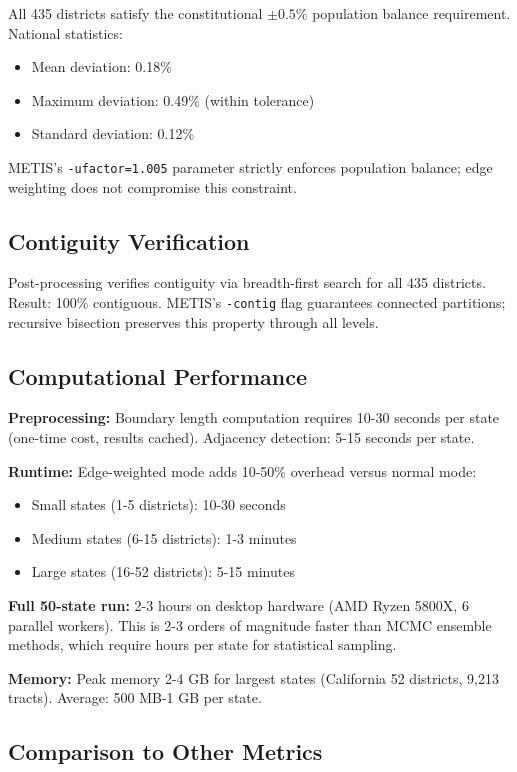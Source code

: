 All 435 districts satisfy the constitutional $\pm 0.5\%$ population balance requirement. National statistics:
\begin{itemize}
    \item Mean deviation: 0.18\%
    \item Maximum deviation: 0.49\% (within tolerance)
    \item Standard deviation: 0.12\%
\end{itemize}

METIS's \texttt{-ufactor=1.005} parameter strictly enforces population balance; edge weighting does not compromise this constraint.

\subsection{Contiguity Verification}

Post-processing verifies contiguity via breadth-first search for all 435 districts. Result: 100\% contiguous. METIS's \texttt{-contig} flag guarantees connected partitions; recursive bisection preserves this property through all levels.

\subsection{Computational Performance}

\textbf{Preprocessing:} Boundary length computation requires 10-30 seconds per state (one-time cost, results cached). Adjacency detection: 5-15 seconds per state.

\textbf{Runtime:} Edge-weighted mode adds 10-50\% overhead versus normal mode:
\begin{itemize}
    \item Small states (1-5 districts): 10-30 seconds
    \item Medium states (6-15 districts): 1-3 minutes
    \item Large states (16-52 districts): 5-15 minutes
\end{itemize}

\textbf{Full 50-state run:} 2-3 hours on desktop hardware (AMD Ryzen 5800X, 6 parallel workers). This is 2-3 orders of magnitude faster than MCMC ensemble methods, which require hours per state for statistical sampling.

\textbf{Memory:} Peak memory 2-4 GB for largest states (California 52 districts, 9,213 tracts). Average: 500 MB-1 GB per state.

\subsection{Comparison to Other Metrics}

